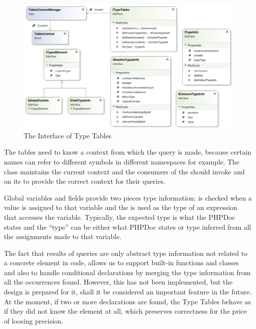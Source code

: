 \begin{figure}[h]  
  \centering
    \includegraphics*[width=\textwidth,height=\textheight,keepaspectratio]{img/tables-ifaces.png}  
    \caption{The Interface of Type Tables\label{tablesifaces}}
\end{figure}

        The tables need to know a context from which the 
        query is made, because certain names can refer 
        to different symbols in different namespaces 
        for example. The  class maintains 
        the current context and the consumers of the  
        should invoke  and  on its 
         to provide the correct context 
        for their queries.

        Global variables and fields provide two pieces type 
        information:  is checked when a 
        value is assigned to that variable and the  
        is used as the type of an expression that accesses 
        the variable. Typically, the expected type is what 
        the PHPDoc states and the ``type'' can be either what 
        PHPDoc states or type inferred from all the assignments 
        made to that variable.
        
        The fact that results of  queries 
        are only abstract type information not related to a 
        concrete element in code, allows us to support built-in 
        functions and classes and also to handle conditional 
        declarations by merging the type information from 
        all the occurrences found. However, this has not 
        been implemented, but the design is prepared for it, 
        shall it be considered an important feature in the future. 
        At the moment, if two or more declarations are found, 
        the Type Tables behave as if they did not know the 
        element at all, which preserves correctness for the 
        price of loosing precision.
        
